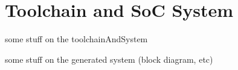 \chapter{Toolchain and SoC System}
\label{cha:toolchainAndSystem}

some stuff on the toolchainAndSystem

some stuff on the generated system (block diagram, etc)

